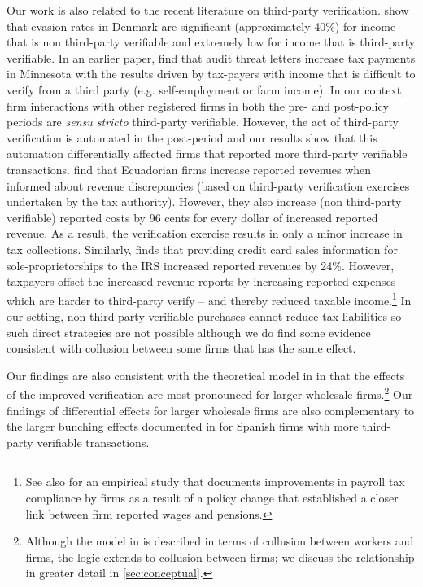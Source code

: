 Our work is also related to the recent literature on third-party verification. \cite{kleven2011unwilling} show that evasion rates in Denmark are significant (approximately 40\%) for income that is non third-party verifiable and extremely low for income that is third-party verifiable. In an earlier paper, \citet{slemrod2001taxpayer} find that audit threat letters increase tax payments in Minnesota with the results driven by tax-payers with income that is difficult to verify from a third party (e.g. self-employment or farm income). In our context, firm interactions with other registered firms in both the pre- and post-policy periods are \emph{sensu stricto} third-party verifiable. However, the act of third-party verification is automated in the post-period and our results show that this automation differentially affected firms that reported more third-party verifiable transactions. \citet{Carrilloetal:2017} find that Ecuadorian firms increase reported revenues when informed about revenue discrepancies (based on third-party verification exercises undertaken by the tax authority). However, they also increase (non third-party verifiable) reported costs by 96 cents for every dollar of increased reported revenue. As a result, the verification exercise results in only a minor increase in tax collections.  Similarly, \citet{slemrod2015does} finds that providing credit card sales information for sole-proprietorships to the IRS increased reported revenues by 24\%. However, taxpayers offset the increased revenue reports by increasing reported expenses -- which are harder to third-party verify -- and thereby reduced taxable income.\footnote{See also \cite{kumler2012enlisting} for an empirical study that documents improvements in payroll tax compliance by firms as a result of a policy change that established a closer link between firm reported wages and pensions.} In our setting, non third-party verifiable purchases cannot reduce tax liabilities so such direct strategies are not possible although we do find some evidence consistent with collusion between some firms that has the same effect.

Our findings are also consistent with the theoretical model in \cite{kleven2016can} in that the effects of the improved verification are most pronounced for larger wholesale firms.\footnote{Although the model in \cite{kleven2016can} is described in terms of collusion between workers and firms, the logic extends to collusion between firms; we discuss the relationship in greater detail in \cref{sec:conceptual}.} Our findings of differential effects for larger wholesale firms are also complementary to the larger bunching effects documented in \citet{almunia2018under} for Spanish firms with more third-party verifiable transactions.


